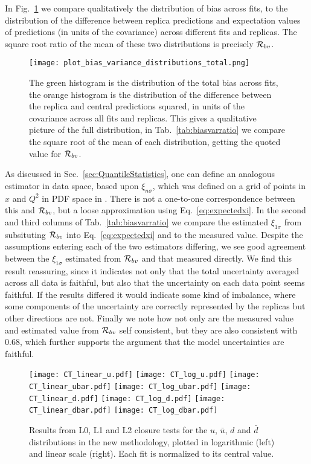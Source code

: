 In Fig.~\ref{eq:bias_varinace_distributions} we compare qualitatively the distribution 
of bias across fits, to the
distribution of the difference between replica predictions and expectation
values of predictions (in units of the covariance) across different fits
and replicas. The square root ratio of the mean of these two distributions
is precisely $\mathcal{R}_{bv}$.

\begin{figure}[h]
    \centering
    \texttt{[image: plot\_bias\_variance\_distributions\_total.png]}
    \caption{The green histogram is the distribution of the total bias across fits,
    the orange histogram is the distribution of the difference between the
    replica and central predictions squared, in units of the covariance
    across all fits and replicas. This gives a qualitative picture of the full
    distribution, in Tab.~\ref{tab:biasvarratio} we compare the square root of the
    mean of each distribution, getting the quoted value for $\mathcal{R}_{bv}$.}
    \label{eq:bias_varinace_distributions}
\end{figure}

As discussed in Sec.~\ref{sec:QuantileStatistics}, one can define an analogous
estimator in data space, based upon $\xi_{n\sigma}$, which was defined on a grid
of points in $x$ and $Q^2$ in PDF space in \cite{nnpdf30}. There is not
a one-to-one correspondence
between this and $\mathcal{R}_{bv}$, but a loose approximation using
Eq.~\ref{eq:expectedxi}. In the second and third columns of Tab.~\ref{tab:biasvarratio} we compare the estimated
$\xi_{1\sigma}$ from
subsituting $\mathcal{R}_{bv}$ into Eq.~\ref{eq:expectedxi} and to the
measured value.
Despite the assumptions entering each of the two estimators differing, we see
good agreement between the $\xi_{1\sigma}$ estimated from $\mathcal{R}_{bv}$
and that measured directly. We find this result reassuring, since it indicates
not only that the total uncertainty averaged across all data is faithful, but
also that the uncertainty on each data point seems faithful. If the results
differed it would indicate some kind of imbalance, where some components
of the uncertainty are correctly represented by the replicas but other directions
are not. Finally we note how not only are the measured value and estimated value from $\mathcal{R}_{bv}$
self consistent, but they are also consistent with $0.68$, which
further supports the argument that the model uncertainties are
faithful.

\iffalse
\begin{figure}[ht]
    \centering
    \texttt{[image: CT\_linear\_u.pdf]}
    \texttt{[image: CT\_log\_u.pdf]}
    \texttt{[image: CT\_linear\_ubar.pdf]}
    \texttt{[image: CT\_log\_ubar.pdf]}
    \texttt{[image: CT\_linear\_d.pdf]}
    \texttt{[image: CT\_log\_d.pdf]}
    \texttt{[image: CT\_linear\_dbar.pdf]}
    \texttt{[image: CT\_log\_dbar.pdf]}
    \caption{Results from L0, L1 and L2 closure tests for the $u$, $\bar{u}$, $d$ and $\bar{d}$ distributions in the new methodology,
    plotted in logarithmic (left) and linear scale (right). Each fit is normalized to its central value.}
    \label{fig:nnpdf40_ct_errors1}    
\end{figure}


